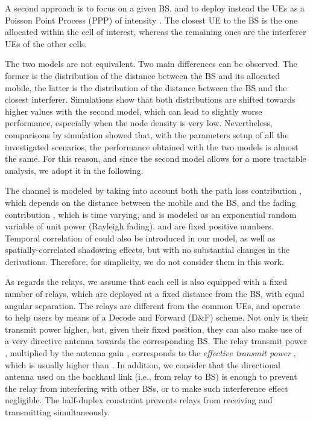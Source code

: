 \documentclass[12pt, letterpaper, onecolumn, draftcls]{IEEEtran}
\begin{document}
A second approach is to focus on a given BS, and to deploy instead the UEs as a Poisson Point Process (PPP)  of intensity . The closest UE to the BS is the one allocated within the cell of interest, whereas the remaining ones are the interferer UEs of the other cells.



The two models are not equivalent. Two main differences can be observed. The former is the distribution of the distance between the BS and its allocated mobile, the latter is the distribution of the distance between the BS and the closest interferer.
Simulations show that both distributions are shifted towards higher values with the second model, which can lead to slightly worse performance, especially when the node density is very low.
Nevertheless, comparisons by simulation showed that, with the parameters setup of all the investigated scenarios, the performance obtained with the two models is almost the same.
For this reason, and since the second model allows for a more tractable analysis, we adopt it in the following.



The channel is modeled by taking into account both the path loss contribution , which depends on the distance  between the mobile and the BS, and the fading contribution , which is time varying,
and is modeled as an exponential random variable of unit power (Rayleigh fading).  and  are fixed positive numbers. Temporal correlation of  could also be introduced in our model, as well as spatially-correlated shadowing effects, but with no substantial changes in the derivations. Therefore, for simplicity, we do not consider them in this work.

As regards the relays, we assume that each cell is also equipped with a fixed number  of relays, which are deployed at a fixed distance  from the BS, with equal angular separation. The relays are different from the common UEs, and operate to help users by means of a Decode and Forward (D\&F) scheme. Not only is their transmit power higher, but, given their fixed position, they can also make use of a very directive antenna towards the corresponding BS.
The relay transmit power , multiplied by the antenna gain , corresponds to the \textit{effective transmit power} , which is usually higher than . In addition, we consider that the directional antenna used on the backhaul link (i.e., from relay to BS) is enough to prevent the relay from interfering with other BSs, or to make such interference effect negligible.
The half-duplex constraint prevents relays from receiving and transmitting simultaneously.
\end{document}
